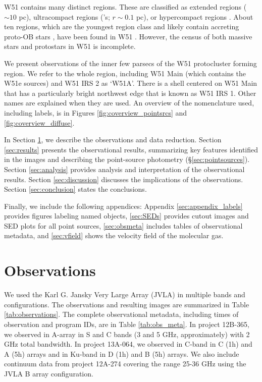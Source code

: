 W51 contains many distinct \hii regions.  These are classified as extended
\hii regions ($\sim10$ pc), ultracompact \hii regions
(\uchii's; $r\sim0.1$ pc), or hypercompact \hii regions \citep[\hchii's;
$r<0.05$ pc][]{Kurtz2002a}.  About ten \hchii regions, which are the
youngest \hii region class and likely contain accreting proto-OB stars
\citep{Peters2010c}, have been found in W51 \citep{Mehringer1994a}.  However,
the census of both massive stars and protostars in W51 is incomplete.

We present observations of the inner few parsecs of the W51 protocluster
forming region.  We refer to the whole region, including W51 Main (which
contains the W51e sources) and W51 IRS 2 as `W51A'.  There is a shell
centered on W51 Main that has a particularly bright northwest edge that is 
known as W51 IRS 1.  Other names are explained
when they are used.  An overview of the nomenclature used, including labels, is
in Figures \ref{fig:coverview_pointsrcs} and \ref{fig:coverview_diffuse}.

In Section \ref{sec:observations}, we describe the observations and data
reduction.  Section \ref{sec:results} presents the observational results,
summarizing key features identified in the images and describing the
point-source photometry (\S \ref{sec:pointsources}).  Section
\ref{sec:analysis} provides analysis and interpretation of the observational
results.  Section \ref{sec:discussion} discusses the implications of the
observations.  Section \ref{sec:conclusion} states the conclusions.

Finally, we include the following appendices: Appendix
\ref{sec:appendix_labels} provides figures labeling named objects,
\ref{sec:SEDs} provides cutout images and SED plots for all point sources,
\ref{sec:obsmeta} includes tables of observational metadata, and
\ref{sec:vfield} shows the velocity field of the molecular gas.


\section{Observations}
\label{sec:observations}
We used the Karl G. Jansky Very Large Array (JVLA) in multiple bands and
configurations. 
The observations and resulting images are summarized in Table
\ref{tab:observations}.  The complete observational metadata, including times
of observation and program IDs, are in Table \ref{tab:obs_meta}.  In project
12B-365, we observed in A-array in S and C bands (3 and 5 GHz, approximately)
with 2 GHz total bandwidth.
In project 13A-064, we observed in C-band in C (1h) and A (5h) arrays and in
Ku-band in D (1h) and B (5h) arrays.
We also include continuum data from project 12A-274
\citep{Goddi2015a,Goddi2016a} covering the range 25-36 GHz using the JVLA B
array configuration.  


